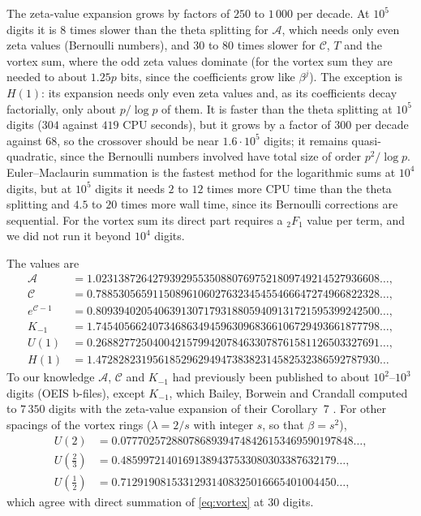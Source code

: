 \documentclass[11pt]{amsart}
\theoremstyle{definition}
\theoremstyle{remark}
\begin{document}
The zeta-value expansion grows by factors of $250$ to $1\,000$ per decade. At $10^5$ digits it is $8$ times slower than
the theta splitting for $\mathcal A$, which needs only even zeta values (Bernoulli numbers), and $30$ to $80$ times
slower for $\mathcal C$, $T$ and the vortex sum, where the odd zeta values dominate (for the vortex sum they are
needed to about $1.25p$ bits, since the coefficients grow like $\beta^j$). The exception is $H(1)$: its expansion needs
only even zeta values and, as its coefficients decay factorially, only about $p/\log p$ of them. It is faster than the
theta splitting at $10^5$ digits ($304$ against $419$ CPU seconds), but it grows by a factor of $300$ per decade
against $68$, so the crossover should be near $1.6\cdot10^5$ digits; it remains quasi-quadratic, since the Bernoulli
numbers involved have total size of order $p^2/\log p$. Euler--Maclaurin summation is the fastest method for the
logarithmic sums at $10^4$ digits, but at $10^5$ digits it needs $2$ to $12$ times more CPU time than the theta
splitting and $4.5$ to $20$ times more wall time, since its Bernoulli corrections are sequential. For the vortex sum its
direct part requires a ${}_2F_1$ value per term, and we did not run it beyond $10^4$ digits.

The values are
\begin{align*}
  \mathcal A &= 1.02313872642793929553508807697521809749214527936608\ldots, \\
  \mathcal C &= 0.78853056591150896106027632345455466647274966822328\ldots, \\
  e^{\mathcal C-1} &= 0.80939402054063913071793188059409131721595399242500\ldots, \\
  K_{-1} &= 1.74540566240734686349459630968366106729493661877798\ldots, \\
  U(1) &= 0.26882772504004215799420784633078761581126503327691\ldots, \\
  H(1) &= 1.47282823195618529629494738382314582532386592787930\ldots
\end{align*}
To our knowledge $\mathcal A$, $\mathcal C$ and $K_{-1}$ had previously been published to about $10^2$--$10^3$ digits
(OEIS b-files), except $K_{-1}$, which Bailey, Borwein and Crandall computed to $7\,350$ digits with the zeta-value
expansion of their Corollary~7 \cite{BBC97}. For other spacings of the vortex rings ($\lambda = 2/s$ with integer $s$,
so that $\beta = s^2$),
\begin{align*}
  U(2) &= 0.07770257288078689394748426153469590197848\ldots, \\
  U(\tfrac23) &= 0.48599721401691389437533080303387632179\ldots, \\
  U(\tfrac12) &= 0.71291908153312931408325016665401004450\ldots,
\end{align*}
which agree with direct summation of \eqref{eq:vortex} at $30$ digits.
\end{document}
